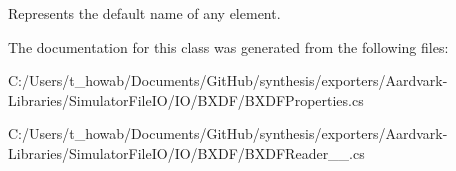 Represents the default name of any element. 



The documentation for this class was generated from the following files\+:\begin{DoxyCompactItemize}
\item 
C\+:/\+Users/t\+\_\+howab/\+Documents/\+Git\+Hub/synthesis/exporters/\+Aardvark-\/\+Libraries/\+Simulator\+File\+I\+O/\+I\+O/\+B\+X\+D\+F/B\+X\+D\+F\+Properties.\+cs\item 
C\+:/\+Users/t\+\_\+howab/\+Documents/\+Git\+Hub/synthesis/exporters/\+Aardvark-\/\+Libraries/\+Simulator\+File\+I\+O/\+I\+O/\+B\+X\+D\+F/B\+X\+D\+F\+Reader\+\_\+\_.\+cs\end{DoxyCompactItemize}
